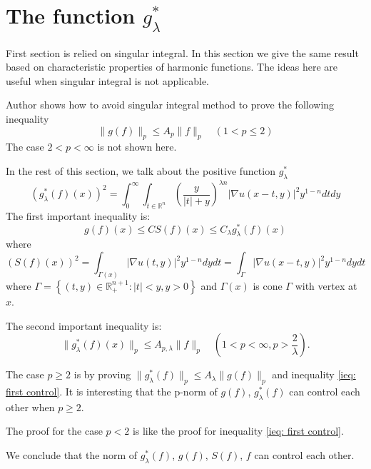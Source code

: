 \documentclass{report}
\theoremstyle{definition}
\theoremstyle{definition}
\theoremstyle{plain}
\numberwithin{theorem}{section}
\numberwithin{remark}{section}
\numberwithin{equation}{section}
\newcommand{\norm}[1]{\lVert#1\rVert}
\newcommand{\abs}[1]{\left\lvert#1\right\rvert}
\begin{document}
\section{The function $g_{\lambda}^*$}
First section is relied on singular integral. In this section we give the same result based on characteristic properties of harmonic functions. The ideas here are useful when singular integral is not applicable.\par
Author shows how to avoid singular integral method to prove the following inequality
\begin{equation}\label{ieq: first control}
    \norm{g(f)}_p\leq A_p\norm{f}_p\quad (1<p\leq 2)
\end{equation}
The case $2<p<\infty$ is not shown here.\par
In the rest of this section, we talk about the positive function $g_{\lambda}^*$
\begin{equation*}
    (g_{\lambda}^*(f)(x))^2=\int_{0}^{\infty}\int_{t\in \mathbb{R}^n}{(\frac{y}{\abs{t}+y})^{\lambda n}\abs{\nabla u(x-t,y)}^2 y^{1-n}dt dy}
\end{equation*}
The first important inequality is:
\begin{equation}
    g(f)(x)\leq CS(f)(x)\leq C_\lambda g_{\lambda}^*(f)(x)
\end{equation}
where 
\begin{equation*}
    (S(f)(x))^2=\int_{\Gamma(x)}{\abs{\nabla u(t,y)}^2 y^{1-n}dydt}=\int_{\Gamma}{\abs{\nabla u(x-t,y)}^2 y^{1-n}dydt}
\end{equation*}
where $\Gamma=\left\{ (t,y)\in \mathbb{R}_+^{n+1}: \abs{t}<y, y>0\right\}$ and $\Gamma(x)$ is cone $\Gamma$ with vertex at $x$.\par
The second important inequality is:
\begin{equation}
    \norm{g_{\lambda}^*(f)(x)}_p\leq A_{p,\lambda}\norm{f}_p\quad (1<p<\infty, p>\frac{2}{\lambda}).   
\end{equation}\par
The case $p\geq 2$ is by proving $\norm{g_{\lambda}^*(f)}_p\leq A_\lambda\norm{g(f)}_p$ and inequality \eqref{ieq: first control}. It is interesting that the p-norm of $g(f)$, $g_{\lambda}^*(f)$ can control each other when $p\geq 2$.\par
The proof for the case $p<2$ is like the proof for inequality \eqref{ieq: first control}.\par
We conclude that the norm of $g_{\lambda}^*(f)$, $g(f)$, $S(f)$, $f$ can control each other.
\end{document}

